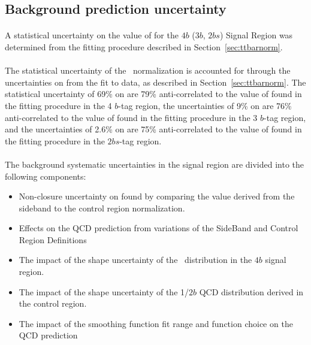 
\subsection{Background prediction uncertainty}
\label{sec:boosted-systematics-bkg}

\paragraph{}
A statistical uncertainty on the value of \muqcd for the $4b$ ($3b$, $2bs$) Signal Region was determined from the fitting procedure described in Section~\ref{sec:ttbarnorm}.

\paragraph{}
The statistical uncertainty of the \ttbar\ normalization is accounted for through the uncertainties on \alphatt from the fit to data, as described in Section~\ref{sec:ttbarnorm}. The statistical uncertainty of 69\% on \alphatt are 79\% anti-correlated to the value of \muqcd found in the fitting procedure in the 4 $b$-tag region, the uncertainties of 9\% on \alphatt are 76\% anti-correlated to the value of \muqcd found in the fitting procedure in the 3 $b$-tag region, and the uncertainties of 2.6\% on \alphatt are 75\% anti-correlated to the value of \muqcd found in the fitting procedure in the $2bs$-tag region.

\paragraph{}
The background systematic uncertainties in the signal region are divided into the following components:
\begin{itemize}
 \item Non-closure uncertainty on \muqcd found by comparing the value derived from the sideband to the control region normalization.
 \item Effects on the QCD prediction from variations of the SideBand and Control Region Definitions
 \item The impact of the shape uncertainty of the \ttbar\ distribution in the $4b$ signal region.
 \item The impact of the shape uncertainty of the 1/$2b$ QCD distribution derived in the control region.
 \item The impact of the smoothing function fit range and function choice on the QCD prediction
\end{itemize}

